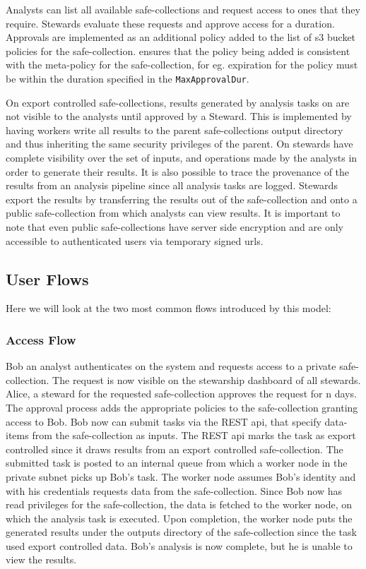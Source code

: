 Analysts can list all available safe-collections and request access to ones that they require.
Stewards evaluate these requests and approve access for a duration. Approvals are implemented as an additional
policy added to the list of s3 bucket policies for the safe-collection. \NAME ensures that the policy
being added is consistent with the meta-policy for the safe-collection, for eg. expiration for the policy
must be within the duration specified in the \texttt{MaxApprovalDur}.

On export controlled safe-collections, results generated by analysis tasks on \NAME are not visible to the
analysts until approved by a Steward. This is implemented by having workers write all results to the
parent safe-collections output directory and thus inheriting the same security privileges of the parent.
On \NAME stewards have complete visibility over the set of inputs, and operations made by the analysts
in order to generate their results. It is also possible to trace the provenance of the results from an
analysis pipeline since all analysis tasks are logged.
Stewards export the results by transferring the results out of the safe-collection and onto a public
safe-collection from which analysts can view results. It is important to note that even public
safe-collections have server side encryption and are only accessible to authenticated users via temporary
signed urls.


\subsection{User Flows}

Here we will look at the two most common flows introduced by this model:

\subsubsection{Access Flow}

Bob an analyst authenticates on the system and requests access to a private safe-collection.
The request is now visible on the stewarship dashboard of all stewards. Alice, a steward for the requested
safe-collection approves the request for n days. The approval process adds the appropriate policies to the
safe-collection granting access to Bob. Bob now can submit tasks via the  REST api, that specify data-items
from the safe-collection as inputs. The REST api marks the task as export controlled since it draws results
from an export controlled safe-collection. The submitted task is posted to an internal queue from which a
worker node in the \NAME private subnet picks up Bob's task. The worker node assumes Bob's identity and with
his credentials requests data from the safe-collection. Since Bob now has read privileges for the
safe-collection, the data is fetched to the worker node, on which the analysis task is executed.
Upon completion, the worker node puts the generated results under the outputs directory of the safe-collection
since the task used export controlled data. Bob's analysis is now complete, but he is unable to view the
results.

